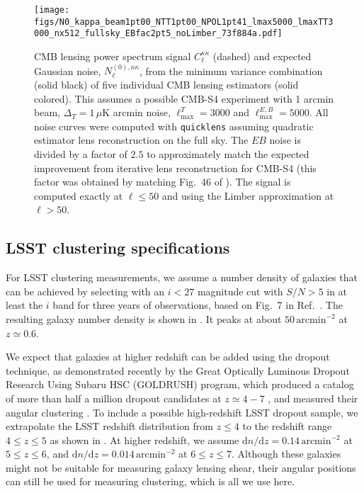 \documentclass[prd,superscriptaddress,floatfix,notitlepage,nofootinbib,reprint]{revtex4-1} %
\begin{document}
\begin{figure}[tbp]
\texttt{[image: figs/N0\_kappa\_beam1pt00\_NTT1pt00\_NPOL1pt41\_lmax5000\_lmaxTT3000\_nx512\_fullsky\_EBfac2pt5\_noLimber\_73f884a.pdf]}
\caption{CMB lensing power spectrum signal $C_\ell^{\kappa\kappa}$ (dashed) and expected Gaussian noise, $N^{(0),\kappa\kappa}_\ell$, from the minimum variance combination (solid black) of five individual CMB lensing estimators (solid colored). 
This assumes a possible CMB-S4 experiment with 1 arcmin beam, $\Delta_{T}=1\,\mu$K arcmin noise, $\ell_\mathrm{max}^{T}=3000$ and $\ell_\mathrm{max}^{E,B}=5000$. All noise curves were computed with \texttt{quicklens} \cite{quicklens,PlanckLensing2015} assuming quadratic estimator lens reconstruction on the full sky. The $EB$ noise is divided by a factor of $2.5$ to approximately match the expected improvement from iterative lens reconstruction \cite{HirataSeljakIterativeRec,SmithHanson1010} for CMB-S4 (this factor was obtained by matching Fig.~46 of \cite{CMBS4SciBook}). 
The signal is computed exactly at $\ell\le 50$ and using the Limber approximation at $\ell>50$.
}
\label{fig:N0}
\end{figure}


\subsection{LSST clustering specifications}
For LSST clustering measurements, we assume a number density of galaxies that can be achieved by selecting with an $i<27$ magnitude cut with $S/N>5$ in at least the $i$ band for three years of observations, based on Fig.~7 in Ref.~\cite{LSST1301}.
The resulting galaxy number density is shown in . 
It peaks at about $50\,\mathrm{arcmin}^{-2}$ at $z\simeq 0.6$.  


We expect that galaxies at higher redshift can be added using the dropout technique, as demonstrated recently by the Great Optically Luminous Dropout Research Using Subaru HSC (GOLDRUSH) program, which produced a catalog of more than half a million dropout candidates at $z\simeq 4-7$ \cite{Goldrush1}, and measured their angular clustering \cite{Goldrush2}.
To include a possible high-redshift LSST dropout sample, we extrapolate the LSST redshift distribution from $z\le 4$ to the redshift range $4\le z \le 5$ as shown in .
At higher redshift, we assume $\mathrm{d}n/\mathrm{d}z=0.14\,\mathrm{arcmin}^{-2}$ at $5 \le z \le 6$, and $\mathrm{d}n/\mathrm{d}z=0.014\,\mathrm{arcmin}^{-2}$ at $6 \le z \le 7$.
Although these galaxies might not be suitable for measuring galaxy lensing shear, their angular positions can still be used for measuring clustering, which is all we use here.
\end{document}
